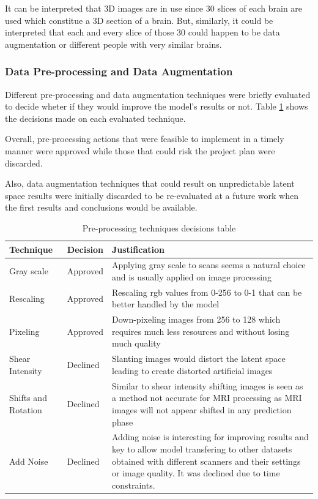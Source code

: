 It can be interpreted that 3D images are in use since 30 slices of each brain are used which constitue a 3D section of a brain. But, similarly, it could be interpreted that each and every slice of those 30 could happen to be data augmentation or different people with very similar brains.

\subsubsection*{Data Pre-processing and Data Augmentation}

Different pre-processing and data augmentation techniques were briefly evaluated to decide wheter if they would improve the model's results or not. Table \ref{table:preprocessing} shows the decisions made on each evaluated technique.

Overall, pre-processing actions that were feasible to implement in a timely manner were approved while those that could risk the project plan were discarded.

Also, data augmentation techniques that could result on unpredictable latent space results were initially discarded to be re-evaluated at a future work when the first results and conclusions would be available.

\begin{table}
    \centering
    \begin{tabular}{p{3cm}|p{2cm}|p{6cm}}
        \hline
        Technique & Decision & Justification \\
        \hline
        Gray scale & Approved & Applying gray scale to scans seems a natural choice and is usually applied on image processing \\
        Rescaling & Approved & Rescaling \acrshort{rgb} values from 0-256 to 0-1 that can be better handled by the model  \\
        Pixeling & Approved & Down-pixeling images from 256 to 128 which requires much less resources and without losing much quality \\
        Shear Intensity & Declined & Slanting images would distort the latent space leading to create distorted artificial images \\
        Shifts and Rotation & Declined & Similar to shear intensity shifting images is seen as a method not accurate for MRI processing as MRI images will not appear shifted in any prediction phase \\
        Add Noise & Declined & Adding noise is interesting for improving results and key to allow model transfering to other datasets obtained with different scanners and their settings or image quality. It was declined due to time constraints. \\
        \hline
    \end{tabular}
    \caption{Pre-processing techniques decisions table}
    \label{table:preprocessing}
\end{table}


